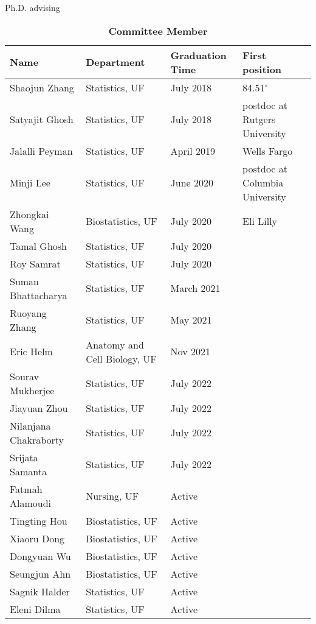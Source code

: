 \documentclass{resume} %
\begin{document}
\begin{rSection}{Ph.D. advising}
\begin{table}[htp]
\caption*{\textbf{Committee Member}}
\begin{center}
\begin{tabular}{l l l l}
\hline
\hline
Name & Department & Graduation Time & First position \\
\hline
Shaojun Zhang & Statistics, UF & July 2018 & 84.51$^\circ$ \\
Satyajit Ghosh & Statistics, UF & July 2018 & postdoc at Rutgers University \\
Jalalli Peyman & Statistics, UF & April 2019 & Wells Fargo \\
Minji Lee & Statistics, UF & June 2020 &postdoc at Columbia University\\
Zhongkai Wang &  Biostatistics, UF & July 2020 & Eli Lilly \\
Tamal Ghosh & Statistics, UF & July 2020 & \\
Roy Samrat & Statistics, UF & July 2020 & \\
Suman Bhattacharya & Statistics, UF & March 2021 & \\
Ruoyang Zhang & Statistics, UF & May 2021 & \\
Eric Helm &  Anatomy and Cell Biology, UF & Nov 2021 & \\
Sourav Mukherjee & Statistics, UF & July 2022 & \\
Jiayuan Zhou & Statistics, UF & July 2022 & \\
Nilanjana Chakraborty & Statistics, UF & July 2022 & \\
Srijata Samanta & Statistics, UF & July 2022 & \\
Fatmah Alamoudi & Nursing, UF & Active & \\
Tingting Hou & Biostatistics, UF & Active & \\
Xiaoru Dong & Biostatistics, UF & Active & \\
Dongyuan Wu & Biostatistics, UF & Active & \\
Seungjun Ahn & Biostatistics, UF & Active & \\
Sagnik Halder & Statistics, UF & Active & \\
Eleni Dilma & Statistics, UF & Active & \\
\hline
\hline
\end{tabular}
\end{center}
\label{default}
\end{table}%

\end{rSection}
\end{document}
